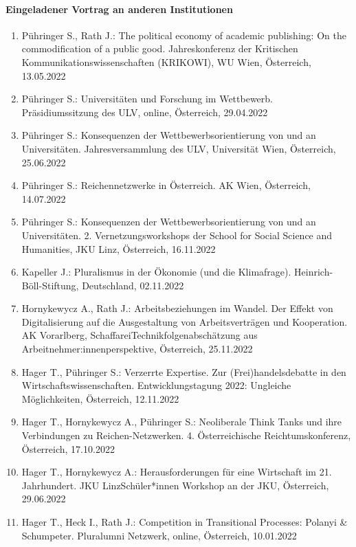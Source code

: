 \paragraph{Eingeladener Vortrag an anderen Institutionen}
\begin{enumerate}
	\item Pühringer S., Rath J.: The political economy of academic publishing: On the commodification of a public good. Jahreskonferenz der Kritischen Kommunikationswissenschaften (KRIKOWI), WU Wien, Österreich, 13.05.2022
	\item Pühringer S.: Universitäten und Forschung im Wettbewerb. Präsidiumssitzung des ULV, online, Österreich, 29.04.2022
	\item Pühringer S.: Konsequenzen der Wettbewerbsorientierung von und an Universitäten. Jahresversammlung des ULV, Universität Wien, Österreich, 25.06.2022
	\item Pühringer S.: Reichennetzwerke in Österreich. AK Wien, Österreich, 14.07.2022
	\item Pühringer S.: Konsequenzen der Wettbewerbsorientierung von und an Universitäten. 2. Vernetzungsworkshops der School for Social Science and Humanities, JKU Linz, Österreich, 16.11.2022
	\item Kapeller J.: Pluralismus in der Ökonomie (und die Klimafrage). Heinrich-Böll-Stiftung, Deutschland, 02.11.2022
	\item Hornykewycz A., Rath J.: Arbeitsbeziehungen im Wandel. Der Effekt von Digitalisierung auf die Ausgestaltung von Arbeitsverträgen und Kooperation. AK Vorarlberg, SchaffareiTechnikfolgenabschätzung aus Arbeitnehmer:innenperspektive, Österreich, 25.11.2022
	\item Hager T., Pühringer S.: Verzerrte Expertise. Zur (Frei)handelsdebatte in den Wirtschaftswissenschaften. Entwicklungstagung 2022: Ungleiche Möglichkeiten, Österreich, 12.11.2022
	\item Hager T., Hornykewycz A., Pühringer S.: Neoliberale Think Tanks und ihre Verbindungen zu Reichen-Netzwerken. 4. Österreichische Reichtumskonferenz, Österreich, 17.10.2022
	\item Hager T., Hornykewycz A.: Herausforderungen für eine Wirtschaft im 21. Jahrhundert. JKU LinzSchüler*innen Workshop an der JKU, Österreich, 29.06.2022
	\item Hager T., Heck I., Rath J.: Competition in Transitional Processes: Polanyi \& Schumpeter. Pluralumni Netzwerk, online, Österreich, 10.01.2022
\end{enumerate}

